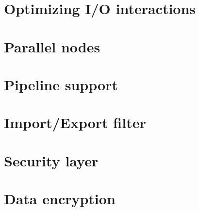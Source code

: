 \section{Optimizing I/O interactions}

\section{Parallel nodes}

\section{Pipeline support}

\section{Import/Export filter}

\section{Security layer}

\section{Data encryption}
